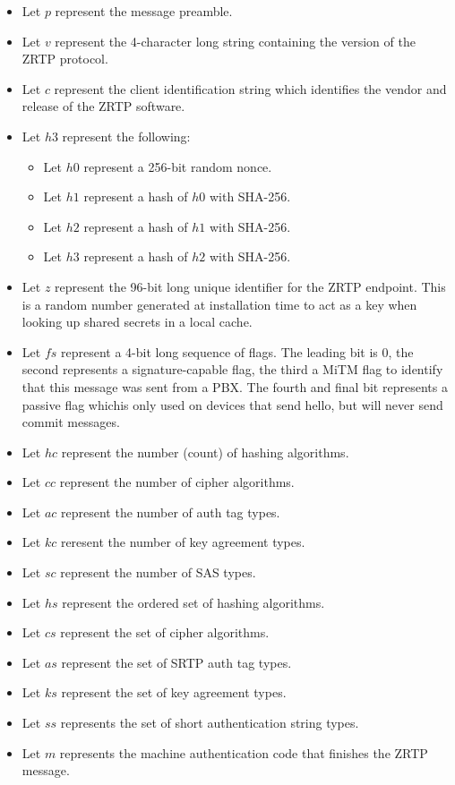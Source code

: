 \documentclass[11pt]{article}
\begin{document}
  \begin{itemize}
    \item Let $p$ represent the message preamble.
    \item Let $v$ represent the 4-character long string containing 
          the version of the ZRTP protocol.
    \item Let $c$ represent the client identification string which
          identifies the vendor and release of the ZRTP software.
    \item Let $h3$ represent the following:
       \begin{itemize}
       \item Let $h0$ represent a 256-bit random nonce.
       \item Let $h1$ represent a hash of $h0$ with SHA-256.
       \item Let $h2$ represent a hash of $h1$ with SHA-256.
       \item Let $h3$ represent a hash of $h2$ with SHA-256.
       \end{itemize}
    \item Let $z$ represent the 96-bit long unique identifier for 
          the ZRTP endpoint. This is a random number generated at 
          installation time to act as a key when looking up 
          shared secrets in a local cache.
    \item Let $fs$ represent a 4-bit long sequence of flags. 
          The leading bit is 0, the second represents a 
          signature-capable flag, the third a MiTM flag to 
          identify that this message was sent from a PBX. The 
          fourth and final bit represents a passive flag 
          whichis only used on devices that send hello, 
          but will never send commit messages.
    \item Let $hc$ represent the number (count) of hashing 
            algorithms.
    \item Let $cc$ represent the number of cipher algorithms.
    \item Let $ac$ represent the number of auth tag types.
    \item Let $kc$ reresent the number of key agreement types.
    \item Let $sc$ represent the number of SAS types.
    \item Let $hs$ represent the ordered set of hashing algorithms.
    \item Let $cs$ represent the set of cipher algorithms.
    \item Let $as$ represent the set of SRTP auth tag types.
    \item Let $ks$ represent the set of key agreement types.
    \item Let $ss$ represents the set of short authentication 
          string types.
    \item Let $m$ represents the machine authentication code 
          that finishes the ZRTP message.
  \end{itemize}
\end{document}
